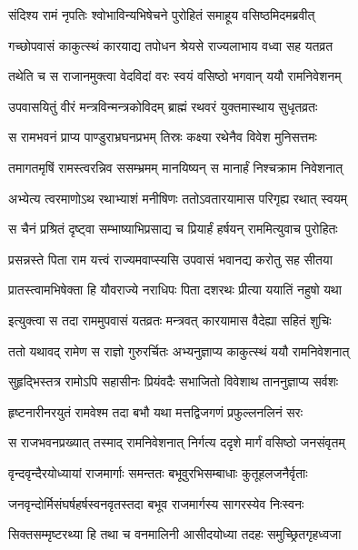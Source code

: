 
\twolineshloka
{संदिश्य रामं नृपतिः श्वोभाविन्यभिषेचने}
{पुरोहितं समाहूय वसिष्ठमिदमब्रवीत्} %

\twolineshloka
{गच्छोपवासं काकुत्स्थं कारयाद्य तपोधन}
{श्रेयसे राज्यलाभाय वध्वा सह यतव्रत} %

\twolineshloka
{तथेति च स राजानमुक्त्वा वेदविदां वरः}
{स्वयं वसिष्ठो भगवान् ययौ रामनिवेशनम्} %

\twolineshloka
{उपवासयितुं वीरं मन्त्रविन्मन्त्रकोविदम्}
{ब्राह्मं रथवरं युक्तमास्थाय सुधृतव्रतः} %

\twolineshloka
{स रामभवनं प्राप्य पाण्डुराभ्रघनप्रभम्}
{तिस्रः कक्ष्या रथेनैव विवेश मुनिसत्तमः} %

\twolineshloka
{तमागतमृषिं रामस्त्वरन्निव ससम्भ्रमम्}
{मानयिष्यन् स मानार्हं निश्चक्राम निवेशनात्} %

\twolineshloka
{अभ्येत्य त्वरमाणोऽथ रथाभ्याशं मनीषिणः}
{ततोऽवतारयामास परिगृह्य रथात् स्वयम्} %

\twolineshloka
{स चैनं प्रश्रितं दृष्ट्वा सम्भाष्याभिप्रसाद्य च}
{प्रियार्हं हर्षयन् राममित्युवाच पुरोहितः} %

\twolineshloka
{प्रसन्नस्ते पिता राम यत्त्वं राज्यमवाप्स्यसि}
{उपवासं भवानद्य करोतु सह सीतया} %

\twolineshloka
{प्रातस्त्वामभिषेक्ता हि यौवराज्ये नराधिपः}
{पिता दशरथः प्रीत्या ययातिं नहुषो यथा} %

\twolineshloka
{इत्युक्त्वा स तदा राममुपवासं यतव्रतः}
{मन्त्रवत् कारयामास वैदेह्या सहितं शुचिः} %

\twolineshloka
{ततो यथावद् रामेण स राज्ञो गुरुरर्चितः}
{अभ्यनुज्ञाप्य काकुत्स्थं ययौ रामनिवेशनात्} %

\twolineshloka
{सुहृद्भिस्तत्र रामोऽपि सहासीनः प्रियंवदैः}
{सभाजितो विवेशाथ ताननुज्ञाप्य सर्वशः} %

\twolineshloka
{हृष्टनारीनरयुतं रामवेश्म तदा बभौ}
{यथा मत्तद्विजगणं प्रफुल्लनलिनं सरः} %

\twolineshloka
{स राजभवनप्रख्यात् तस्माद् रामनिवेशनात्}
{निर्गत्य ददृशे मार्गं वसिष्ठो जनसंवृतम्} %

\twolineshloka
{वृन्दवृन्दैरयोध्यायां राजमार्गाः समन्ततः}
{बभूवुरभिसम्बाधाः कुतूहलजनैर्वृताः} %

\twolineshloka
{जनवृन्दोर्मिसंघर्षहर्षस्वनवृतस्तदा}
{बभूव राजमार्गस्य सागरस्येव निःस्वनः} %

\twolineshloka
{सिक्तसम्मृष्टरथ्या हि तथा च वनमालिनी}
{आसीदयोध्या तदहः समुच्छ्रितगृहध्वजा} %

